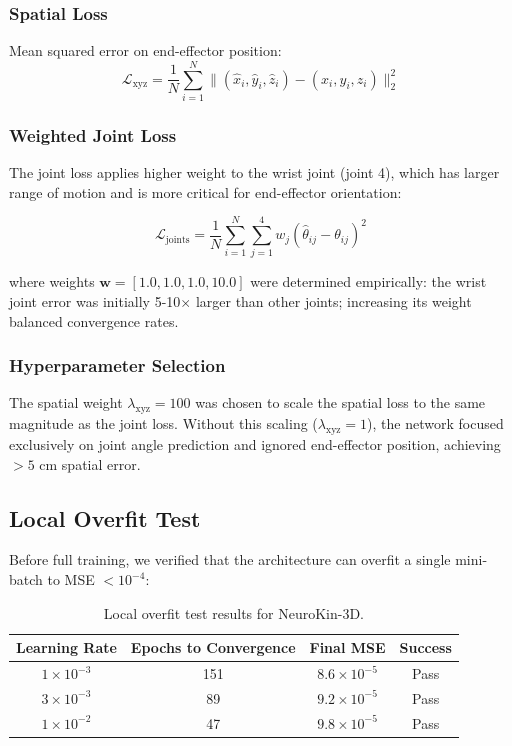 ﻿\documentclass[12pt,a4paper,oneside]{report}
\begin{document}
\subsubsection{Spatial Loss}

Mean squared error on end-effector position:
\begin{equation}
\mathcal{L}_{\text{xyz}} = \frac{1}{N} \sum_{i=1}^{N} \|(\hat{x}_i, \hat{y}_i, \hat{z}_i) - (x_i, y_i, z_i)\|_2^2
\end{equation}

\subsubsection{Weighted Joint Loss}

The joint loss applies higher weight to the wrist joint (joint 4), which has larger range of motion and is more critical for end-effector orientation:

\begin{equation}
\mathcal{L}_{\text{joints}} = \frac{1}{N} \sum_{i=1}^{N} \sum_{j=1}^{4} w_j (\hat{\theta}_{ij} - \theta_{ij})^2
\end{equation}

where weights $\mathbf{w} = [1.0, 1.0, 1.0, 10.0]$ were determined empirically: the wrist joint error was initially 5-10$\times$ larger than other joints; increasing its weight balanced convergence rates.

\subsubsection{Hyperparameter Selection}

The spatial weight $\lambda_{\text{xyz}} = 100$ was chosen to scale the spatial loss to the same magnitude as the joint loss. Without this scaling ($\lambda_{\text{xyz}} = 1$), the network focused exclusively on joint angle prediction and ignored end-effector position, achieving $>5$ cm spatial error.

\subsection{Local Overfit Test}

Before full training, we verified that the architecture can overfit a single mini-batch to MSE $< 10^{-4}$:

\begin{table}[H]
\centering
\caption{Local overfit test results for NeuroKin-3D.}
\label{tab:overfit_test}
\begin{tabular}{cccc}
\toprule
Learning Rate & Epochs to Convergence & Final MSE & Success \\
\midrule
$1 \times 10^{-3}$ & 151 & $8.6 \times 10^{-5}$ & Pass \\
$3 \times 10^{-3}$ & 89 & $9.2 \times 10^{-5}$ & Pass \\
$1 \times 10^{-2}$ & 47 & $9.8 \times 10^{-5}$ & Pass \\
\bottomrule
\end{tabular}
\end{table}
\end{document}

